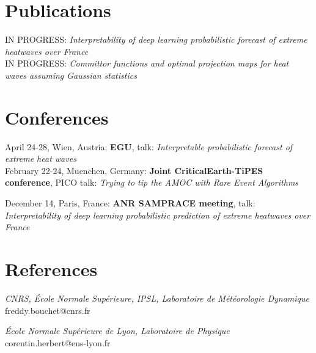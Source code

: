\documentclass[11pt, a4 paper]{article}
\begin{document}
\section*{Publications}
  \begin{description}[style=multiline,leftmargin=3cm,align=right]
    \item[2023]
      IN PROGRESS: \emph{Interpretability of deep learning probabilistic forecast of extreme heatwaves over France} \\
      IN PROGRESS: \emph{Committor functions and optimal projection maps for heat waves assuming Gaussian statistics}
  \end{description}

\section*{Conferences}
  \begin{description}[style=multiline,leftmargin=3cm,align=right]
    \item[2023] 
      April 24-28, Wien, Austria: \textbf{EGU}, talk: \emph{Interpretable probabilistic forecast of extreme heat waves} \\
      February 22-24, Muenchen, Germany: \textbf{Joint CriticalEarth-TiPES conference}, PICO talk: \emph{Trying to tip the AMOC with Rare Event Algorithms}
    \item[2022]
      December 14, Paris, France: \textbf{ANR SAMPRACE meeting}, talk: \emph{Interpretability of deep learning probabilistic prediction of extreme heatwaves over France}
  \end{description}


\section*{References}
\begin{description}[style=multiline,leftmargin=4cm,align=right]
  \item[Freddy Bouchet]
    \emph{CNRS, \'Ecole Normale Sup\'erieure, IPSL, Laboratoire de M\'et\'eorologie Dynamique} \\
    freddy.bouchet@cnrs.fr
  \item[Corentin Herbert]
    \emph{\'Ecole Normale Sup\'erieure de Lyon, Laboratoire de Physique} \\
    corentin.herbert@ens-lyon.fr

\end{description}
\end{document}
